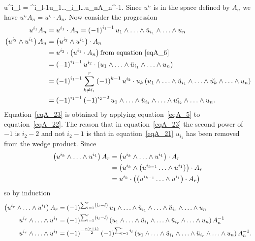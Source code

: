 \be
	u^{i_{l}} = ^{i_{l}-1}u_{1}\W\dots\W{}_{i_{l}}\W\dots\W u_{n}A_{n}^{-1}.
\ee
Since $u^{i_{l}}$ is in the space defined by $A_{n}$ we have $u^{i_{l}}A_{n}=u^{i_{l}}\cdot A_{n}$.  Now consider the progression
\begin{align}
	u^{i_{1}}A_{n} &= u^{i_{1}}\cdot A_{n} = \paren{-1}^{i_{1}-1}u_{1}\W\dots\W\breve{u}_{i_{1}}\W\dots\W u_{n} \\
	\paren{u^{i_{2}}\W u^{i_{1}}}A_{n} &= \paren{u^{i_{2}}\W u^{i_{1}}}\cdot A_{n} \nn \\
	                                   &= u^{i_{2}}\cdot\paren{u^{i_{1}}\cdot A_{n}} \mbox{from equation~\ref{eqA_6}} \\
	                                   &= \paren{-1}^{i_{1}-1}u^{i_{2}}\cdot\paren{u_{1}\W\dots\W\breve{u}_{i_{1}}\W\dots\W u_{n}} \label{eqA_21}\\
	                                   &= \paren{-1}^{i_{1}-1}\sum_{k\ne i_{1}}^{r}\paren{-1}^{k-1}u^{i_{2}}\cdot u_{k}
	                                      \paren{u_{1}\W\dots\W\breve{u}_{i_{1}}\W\dots\W\breve{u_{k}}\W\dots\W u_{n}} \label{eqA_22}\\
	                                   &= \paren{-1}^{i_{1}-1}\paren{-1}^{i_{2}-2}u_{1}\W\dots\W\breve{u}_{i_{1}}\W\dots\W\breve{u_{i_{2}}}\W\dots\W u_{n}. \label{eqA_23}
\end{align}
Equation~\ref{eqA_23} is obtained by applying equation~\ref{eqA_5} to equation~\ref{eqA_22}.  The reason that in equation~\ref{eqA_23} the second power of $-1$ is $i_{2}-2$ and
not $i_{2}-1$ is that in equation~\ref{eqA_21} $u_{i_{1}}$ has been removed from the wedge product. Since
\begin{align}
	\paren{u^{i_{k}}\W\dots\W u^{i_{1}}}A_{r} &= \paren{u^{i_{k}}\W\dots\W u^{i_{1}}}\cdot A_{r} \nn \\
	                                          &= \paren{u^{i_{k}}\W\paren{u^{i_{k-1}}\dots\W u^{i_{1}}}}\cdot A_{r} \nn \\
	                                          &= u^{i_{k}}\cdot\paren{\paren{u^{i_{k-1}}\dots\W u^{i_{1}}}\cdot A_{r}}
\end{align}
so by induction
\begin{align}
	\paren{u^{i_{r}}\W\dots\W u^{i_{1}}}A_{r} &= \paren{-1}^{\sum_{l=1}^{r}\paren{i_{l}-l}}u_{1}\W\dots\W \breve{u}_{i_{1}}\W\dots\W\breve{u}_{i_{r}}\W\dots\W u_{n} \\
	u^{i_{r}}\W\dots\W u^{i_{1}} &= \paren{-1}^{\sum_{l=1}^{r}\paren{i_{l}-l}}\paren{u_{1}\W\dots\W \breve{u}_{i_{1}}\W\dots\W\breve{u}_{i_{r}}\W\dots\W u_{n}}A_{n}^{-1} \\
	u^{i_{r}}\W\dots\W u^{i_{1}} &= \paren{-1}^{-\frac{r\paren{r+1}}{2}}\paren{-1}^{\sum_{l=1}^{r}i_{l}}\paren{u_{1}\W\dots\W 
	                                \breve{u}_{i_{1}}\W\dots\W\breve{u}_{i_{r}}\W\dots\W u_{n}}A_{n}^{-1}. \label{eqA_27}
\end{align}
